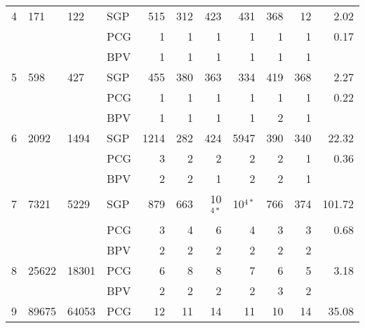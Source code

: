 \documentclass[11pt]{article}
\newcommand{\0}{\phantom{0}}
\begin{document}
\begin{table}[ht]
\begin{threeparttable}
\begin{tabular}{llllrrrrrrr}
			\midrule
			4   & 171     & 122     & SGP & 515                                        & 312 & 423       & 431       & 368 & 12  & 2.02           \\
			    &         &         & PCG & 1                                          & 1   & 1         & 1         & 1   & 1   & 0.17           \\
			    &         &         & BPV & 1                                          & 1   & 1         & 1         & 1   & 1   & \bm{$0.09$}    \\
			\midrule
			5   & 598     & 427     & SGP & 455                                        & 380 & 363       & 334       & 419 & 368 & 2.27           \\
			    &         &         & PCG & 1                                          & 1   & 1         & 1         & 1   & 1   & 0.22           \\
			    &         &         & BPV & 1                                          & 1   & 1         & 1         & 2   & 1   & \bm{$0.12$}    \\
			\midrule
			6   & 2092    & 1494    & SGP & 1214                                       & 282 & 424       & 5947      & 390 & 340 & 22.32          \\
			    &         &         & PCG & 3                                          & 2   & 2         & 2         & 2   & 1   & 0.36           \\
			    &         &         & BPV & 2                                          & 2   & 1         & 2         & 2   & 1   & \bm{$0.17$}    \\
			\midrule
			7   & 7321    & 5229    & SGP & 879                                        & 663 & 10$^{4*}$ & 10$^{4*}$ & 766 & 374 & 101.72         \\
			    &         &         & PCG & 3                                          & 4   & 6         & 4         & 3   & 3   & 0.68           \\
			    &         &         & BPV & 2                                          & 2   & 2         & 2         & 2   & 2   & \bm{$0.57$}    \\
			\midrule
			8   & 25622   & 18301   & PCG & 6                                          & 8   & 8         & 7         & 6   & 5   & 3.18           \\
			    &         &         & BPV & 2                                          & 2   & 2         & 2         & 3   & 2   & \bm{$1.76$}    \\
			\midrule
			9   & 89675   & 64053   & PCG & 12                                         & 11  & 14        & 11        & 10  & 14  & 35.08          \\

\end{tabular}
\end{threeparttable}
\end{table}
\end{document}
